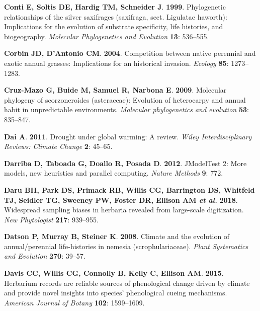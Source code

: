 \documentclass[man,floatsintext]{apa6}
\theoremstyle{definition}
\theoremstyle{definition}
\theoremstyle{definition}
\theoremstyle{remark}
\begin{document}
\leavevmode\hypertarget{ref-conti1999phylogenetic}{}%
\textbf{\textnormal{Conti E}, \textnormal{Soltis DE}, \textnormal{Hardig
TM}, \textnormal{Schneider J}}. \textbf{1999}. Phylogenetic
relationships of the silver saxifrages (saxifraga, sect. Ligulatae
haworth): Implications for the evolution of substrate specificity, life
histories, and biogeography. \emph{Molecular Phylogenetics and
Evolution} \textbf{13}: 536--555.

\leavevmode\hypertarget{ref-corbin2004competition}{}%
\textbf{\textnormal{Corbin JD}, \textnormal{D'Antonio CM}}.
\textbf{2004}. Competition between native perennial and exotic annual
grasses: Implications for an historical invasion. \emph{Ecology}
\textbf{85}: 1273--1283.

\leavevmode\hypertarget{ref-cruz2009molecular}{}%
\textbf{\textnormal{Cruz-Mazo G}, \textnormal{Buide M},
\textnormal{Samuel R}, \textnormal{Narbona E}}. \textbf{2009}. Molecular
phylogeny of scorzoneroides (asteraceae): Evolution of heterocarpy and
annual habit in unpredictable environments. \emph{Molecular
phylogenetics and evolution} \textbf{53}: 835--847.

\leavevmode\hypertarget{ref-dai2011drought}{}%
\textbf{\textnormal{Dai A}}. \textbf{2011}. Drought under global
warming: A review. \emph{Wiley Interdisciplinary Reviews: Climate
Change} \textbf{2}: 45--65.

\leavevmode\hypertarget{ref-darriba2012jmodeltest}{}%
\textbf{\textnormal{Darriba D}, \textnormal{Taboada G},
\textnormal{Doallo R}, \textnormal{Posada D}}. \textbf{2012}. JModelTest
2: More models, new heuristics and parallel computing. \emph{Nature
Methods} \textbf{9}: 772.

\leavevmode\hypertarget{ref-daru2018widespread}{}%
\textbf{\textnormal{Daru BH}, \textnormal{Park DS}, \textnormal{Primack
RB}, \textnormal{Willis CG}, \textnormal{Barrington DS},
\textnormal{Whitfeld TJ}, \textnormal{Seidler TG}, \textnormal{Sweeney
PW}, \textnormal{Foster DR}, \textnormal{Ellison AM} \emph{et al.}}
\textbf{2018}. Widespread sampling biases in herbaria revealed from
large-scale digitization. \emph{New Phytologist} \textbf{217}: 939--955.

\leavevmode\hypertarget{ref-datson2008climate}{}%
\textbf{\textnormal{Datson P}, \textnormal{Murray B},
\textnormal{Steiner K}}. \textbf{2008}. Climate and the evolution of
annual/perennial life-histories in nemesia (scrophulariaceae).
\emph{Plant Systematics and Evolution} \textbf{270}: 39--57.

\leavevmode\hypertarget{ref-davis2015herbarium}{}%
\textbf{\textnormal{Davis CC}, \textnormal{Willis CG},
\textnormal{Connolly B}, \textnormal{Kelly C}, \textnormal{Ellison AM}}.
\textbf{2015}. Herbarium records are reliable sources of phenological
change driven by climate and provide novel insights into species'
phenological cueing mechanisms. \emph{American Journal of Botany}
\textbf{102}: 1599--1609.
\end{document}
